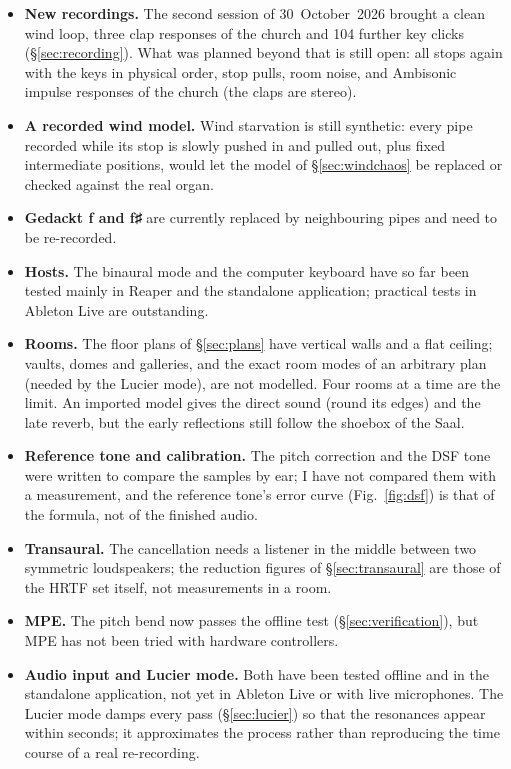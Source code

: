 \documentclass[11pt,a4paper,parskip=half,DIV=11,toc=bibliography]{scrartcl}
\begin{document}
\begin{itemize}
  \item \textbf{New recordings.} The second session of 30~October~2026 brought a clean wind loop, three clap
        responses of the church and 104 further key clicks (\S\ref{sec:recording}). What was planned beyond that is
        still open: all stops again with the keys in physical order, stop pulls, room noise, and Ambisonic impulse
        responses of the church (the claps are stereo).
  \item \textbf{A recorded wind model.} Wind starvation is still synthetic: every pipe recorded while its stop is
        slowly pushed in and pulled out, plus fixed intermediate positions, would let the model of \S\ref{sec:windchaos}
        be replaced or checked against the real organ.
  \item \textbf{Gedackt f and f♯} are currently replaced by neighbouring pipes and need to be re-recorded.
  \item \textbf{Hosts.} The binaural mode and the computer keyboard have so far been tested mainly in Reaper
        and the standalone application; practical tests in Ableton Live are outstanding.
  \item \textbf{Rooms.} The floor plans of \S\ref{sec:plans} have vertical walls and a flat ceiling; vaults, domes
        and galleries, and the exact room modes of an arbitrary plan (needed by the Lucier mode), are not modelled.
        Four rooms at a time are the limit. An imported model gives the direct sound (round its edges) and the late reverb, but the early reflections still follow the shoebox of the Saal.
  \item \textbf{Reference tone and calibration.} The pitch correction and the DSF tone were written to compare the samples by ear; I have not
        compared them with a measurement, and the reference tone's error curve (Fig.~\ref{fig:dsf}) is that of the formula, not of the finished audio.
  \item \textbf{Transaural.} The cancellation needs a listener in the middle between two symmetric loudspeakers; the reduction
        figures of \S\ref{sec:transaural} are those of the HRTF set itself, not measurements in a room.
  \item \textbf{MPE.} The pitch bend now passes the offline test (\S\ref{sec:verification}), but MPE has not been tried with hardware controllers.
  \item \textbf{Audio input and Lucier mode.} Both have been tested offline and in the standalone application, not yet in Ableton Live or with live microphones. The Lucier mode damps every pass (\S\ref{sec:lucier}) so that the resonances appear within seconds; it approximates the process rather than reproducing the time course of a real re-recording.

\end{itemize}
\end{document}
